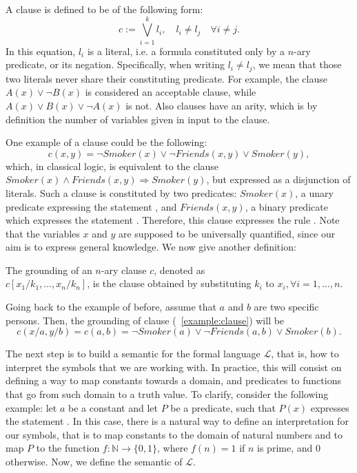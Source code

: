 \begin{definition}[Clause]
	A clause is defined to be of the following form:
	\begin{equation}
	c := \bigvee_{i=1}^k l_i, \quad l_i \neq l_j \quad \forall i \neq j.
	\end{equation}
	In this equation, $l_i$ is a literal, i.e. a formula constituted only by a $n$-ary predicate, or its negation. Specifically, when writing $l_i \neq l_j$, we mean that those two literals never share their constituting predicate. For example, the clause $A(x) \vee \neg B(x)$ is considered an acceptable clause, while $A(x) \vee B(x) \vee \neg A(x)$ is not. Also clauses have an arity, which is by definition the number of variables given in input to the clause.
\end{definition}

One example of a clause could be the following: 
\begin{equation}
c(x,y) = \neg Smoker(x) \vee \neg Friends(x,y) \vee Smoker(y),
\label{example:clause}
\end{equation} which, in classical logic, is equivalent to the clause $Smoker(x) \wedge Friends(x,y) \Rightarrow Smoker(y)$, but expressed as a disjunction of literals. Such a clause is constituted by two predicates: $Smoker(x)$, a unary predicate expressing the statement , and $Friends(x,y)$, a binary predicate which expresses the statement . Therefore, this clause expresses the rule . Note that the variables $x$ and $y$ are supposed to be universally quantified, since our aim is to express general knowledge. We now give another definition:

\begin{definition}
	The grounding of an $n$-ary clause $c$, denoted as \\ $c[x_1/k_1, \dots, x_n/k_n]$,
	is the clause obtained by substituting $k_i$ to $x_i, \forall i=1,\dots,n$.
\end{definition}

Going back to the example of before, assume that $a$ and $b$ are two specific persons. Then, the grounding of clause (~\ref{example:clause}) will be $$c(x/a, y/b) = c(a,b) = \neg Smoker(a) \vee \neg Friends(a,b) \vee Smoker(b).$$

The next step is to build a semantic for the formal language $\mathcal{L}$, that is, how to interpret the symbols that we are working with. In practice, this will consist on defining a way to map constants towards a domain, and predicates to functions that go from such domain to a truth value. To clarify, consider the following example: let $a$ be a constant and let $P$ be a predicate, such that $P(x)$ expresses the statement . In this case, there is a natural way to define an interpretation for our symbols, that is to map constants to the domain of natural numbers and to map $P$ to the function $f: \mathbb{N}\longrightarrow\{0,1\}$, where $f(n)=1$ if $n$ is prime, and $0$ otherwise. Now, we define the semantic of $\mathcal{L}$.

